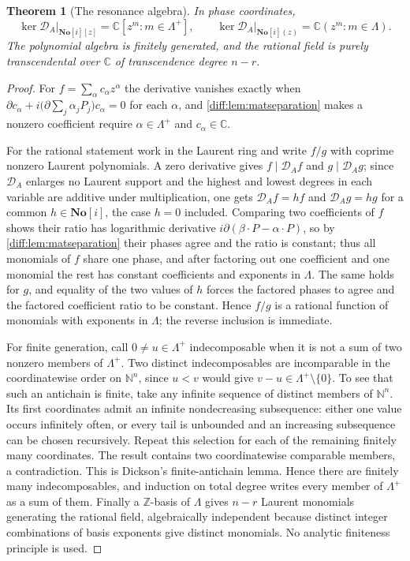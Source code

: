 \documentclass[11pt,letterpaper]{article}
\numberwithin{equation}{section}
\newtheorem{theorem}{Theorem}[section]
\theoremstyle{definition}
\theoremstyle{remark}
\newcommand{\SC}{\mathbf{No}[i]}
\newcommand{\C}{\mathbb C}
\newcommand{\Z}{\mathbb Z}
\newcommand{\N}{\mathbb N}
\newcommand{\der}{\partial}
\newcommand{\Ker}{\operatorname{ker}}
\begin{document}
\begin{theorem}[The resonance algebra]
\label{diff:thm:matresonance}
In phase coordinates,
\begin{equation}\label{diff:eq:matinvariantring}
 \Ker\mathcal D_{A}\big|_{\SC[z]}=\C[z^{m}:m\in\Lambda^{+}],
 \qquad
 \Ker\mathcal D_{A}\big|_{\SC(z)}=\C(z^{m}:m\in\Lambda).
\end{equation}
The polynomial algebra is finitely generated, and the rational field is purely
transcendental over $\C$ of transcendence degree $n-r$.
\end{theorem}
\begin{proof}
For $f=\sum_{\alpha}c_{\alpha}z^{\alpha}$ the derivative vanishes exactly when
$\der c_{\alpha}+i\bigl(\der\sum_{j}\alpha_{j}P_{j}\bigr)c_{\alpha}=0$ for each
$\alpha$, and \cref{diff:lem:matseparation} makes a nonzero coefficient
require $\alpha\in\Lambda^{+}$ and $c_{\alpha}\in\C$.

For the rational statement work in the Laurent ring and write $f/g$ with
coprime nonzero Laurent polynomials. A zero derivative gives
$f\mid\mathcal D_{A}f$ and $g\mid\mathcal D_{A}g$; since
$\mathcal D_{A}$ enlarges no Laurent support and the highest and lowest degrees
in each variable are additive under multiplication, one gets
$\mathcal D_{A}f=hf$ and $\mathcal D_{A}g=hg$ for a common $h\in\SC$, the case
$h=0$ included. Comparing two coefficients of $f$ shows their ratio has
logarithmic derivative $i\der(\beta\cdot P-\alpha\cdot P)$, so by
\cref{diff:lem:matseparation} their phases agree and the ratio is constant;
thus all monomials of $f$ share one phase, and after factoring out one
coefficient and one monomial the rest has constant coefficients and exponents
in $\Lambda$. The same holds for $g$, and equality of the two values of $h$
forces the factored phases to agree and the factored coefficient ratio to be
constant. Hence $f/g$ is a rational function of monomials with exponents in
$\Lambda$; the reverse inclusion is immediate.

For finite generation, call $0\neq u\in\Lambda^{+}$ indecomposable when it is
not a sum of two nonzero members of $\Lambda^{+}$. Two distinct
indecomposables are incomparable in the coordinatewise order on $\N^{n}$,
since $u<v$ would give $v-u\in\Lambda^{+}\setminus\{0\}$. To see that
such an antichain is finite, take any infinite sequence of distinct members
of $\N^{n}$. Its first coordinates admit an infinite nondecreasing
subsequence: either one value occurs infinitely often, or every tail is
unbounded and an increasing subsequence can be chosen recursively. Repeat
this selection for each of the remaining finitely many coordinates. The
result contains two coordinatewise comparable members, a contradiction. This
is Dickson's finite-antichain lemma. Hence there are finitely many
indecomposables, and induction on total degree writes every member of
$\Lambda^{+}$ as a sum of them. Finally a
$\Z$-basis of $\Lambda$ gives $n-r$ Laurent monomials generating the rational
field, algebraically independent because distinct integer combinations of
basis exponents give distinct monomials. No analytic finiteness principle is
used.
\end{proof}
\end{document}
